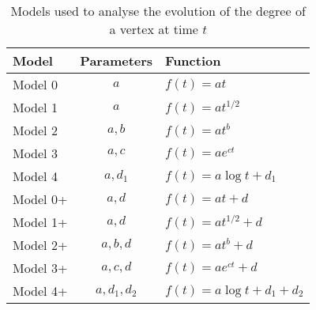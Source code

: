 \begin{table}[ht]
\centering
\begin{tabular}{lcl}
\toprule
Model & Parameters & Function \\
\midrule
Model 0 & $a$ & $f(t) = at$ \\
Model 1 & $a$ & $f(t) = at^{1/2}$ \\
Model 2 & $a, b$ & $f(t) = at^b$ \\
Model 3 & $a, c$ & $f(t) = ae^{ct}$ \\
Model 4 & $a, d_1$ & $f(t) = a \log{t + d_1}$ \\
Model 0+ & $a, d$ & $f(t) = at + d$ \\
Model 1+ & $a, d$ & $f(t) = at^{1/2} + d$ \\
Model 2+ & $a, b, d$ & $f(t) = at^b + d$ \\
Model 3+ & $a, c, d$ & $f(t) = ae^{ct} + d$ \\
Model 4+ & $a, d_1, d_2$ & $f(t) = a \log{t + d_1} + d_2$ \\
\bottomrule
\end{tabular}
\caption{Models used to analyse the evolution of the degree of a vertex at time $t$}\label{tab:models_deg_evol}
\end{table}
